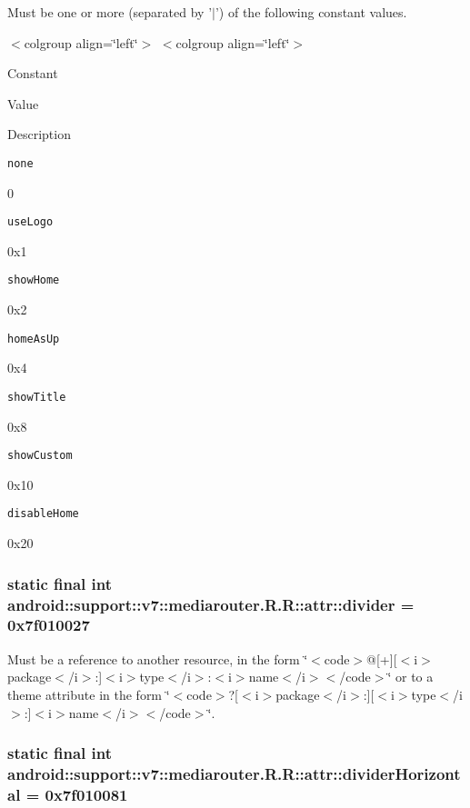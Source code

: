 Must be one or more (separated by '$|$') of the following constant values. \begin{TabularC}{0}
\hline
\end{TabularC}
$<$colgroup align=\char`\"{}left\char`\"{}$>$ $<$colgroup align=\char`\"{}left\char`\"{}$>$ 

Constant

Value

Description 

{\tt none}

0

{\tt useLogo}

0x1

{\tt showHome}

0x2

{\tt homeAsUp}

0x4

{\tt showTitle}

0x8

{\tt showCustom}

0x10

{\tt disableHome}

0x20\hypertarget{classandroid_1_1support_1_1v7_1_1mediarouter_1_1_r_1_1attr_faa7848c972f3dde311332b99f1236e5}{
\subsubsection[{divider}]{\setlength{\rightskip}{0pt plus 5cm}static final int android::support::v7::mediarouter.R.R::attr::divider = 0x7f010027}}
\label{classandroid_1_1support_1_1v7_1_1mediarouter_1_1_r_1_1attr_faa7848c972f3dde311332b99f1236e5}


Must be a reference to another resource, in the form \char`\"{}$<$code$>$@\mbox{[}+\mbox{]}\mbox{[}$<$i$>$package$<$/i$>$:\mbox{]}$<$i$>$type$<$/i$>$:$<$i$>$name$<$/i$>$$<$/code$>$\char`\"{} or to a theme attribute in the form \char`\"{}$<$code$>$?\mbox{[}$<$i$>$package$<$/i$>$:\mbox{]}\mbox{[}$<$i$>$type$<$/i$>$:\mbox{]}$<$i$>$name$<$/i$>$$<$/code$>$\char`\"{}. \hypertarget{classandroid_1_1support_1_1v7_1_1mediarouter_1_1_r_1_1attr_c13d9767dcc89e35dceaa68100bf562d}{
\subsubsection[{dividerHorizontal}]{\setlength{\rightskip}{0pt plus 5cm}static final int android::support::v7::mediarouter.R.R::attr::dividerHorizontal = 0x7f010081}}
\label{classandroid_1_1support_1_1v7_1_1mediarouter_1_1_r_1_1attr_c13d9767dcc89e35dceaa68100bf562d}


